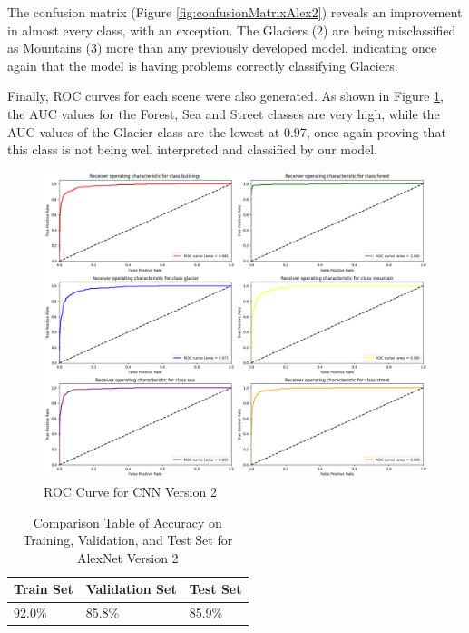 \documentclass[conference]{IEEEtran}
\begin{document}
The confusion matrix (Figure \ref{fig:confusionMatrixAlex2}) reveals 
an improvement in almost every class, with an exception. The Glaciers (2) are being misclassified as Mountains (3) more than any previously developed model, indicating once again that the model is having problems correctly classifying  Glaciers.


Finally, ROC curves for each scene were also generated. As shown in Figure \ref{fig:rocAlex2}, the AUC values for the Forest, Sea and Street classes are very high, while the AUC values of the Glacier class are the lowest at 0.97, once again proving that this class is not being well interpreted and classified by our model. 

\begin{figure}[H]
    \centering
    \includegraphics[width=0.9\linewidth]{images/roc_alex_2.png}
    \caption{ROC Curve for CNN Version 2}
    \label{fig:rocAlex2}
\end{figure}



\begin{table}[H]
    \centering
    \caption{Comparison Table of Accuracy on Training, Validation, and Test Set for AlexNet Version 2}
    \renewcommand{\arraystretch}{1.5}
    \begin{tabularx}{0.8\linewidth}{|X|X|X|}
    \hline
    \cellcolor[HTML]{EFEFEF}\textbf{Train Set} & \cellcolor[HTML]{EFEFEF}\textbf{Validation Set} & \cellcolor[HTML]{EFEFEF}\textbf{Test Set} \\ \hline
     92.0\%  & 85.8\%  & 85.9\%\\ \hline
    \end{tabularx}
    \label{tab:accMobileNetV2_1}
\end{table}
\end{document}
